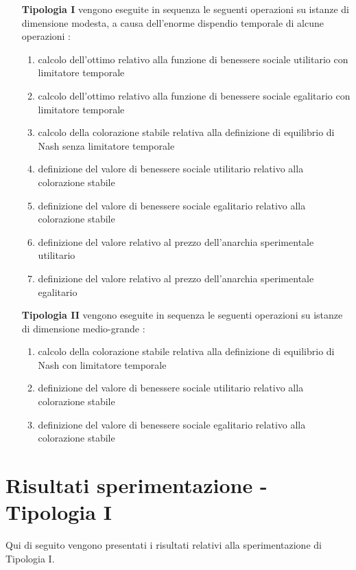 \begin{itemize}
	\item [\textbf{Tipologia I}] vengono eseguite in sequenza le seguenti operazioni su istanze di dimensione modesta, a causa dell'enorme dispendio temporale di alcune operazioni :
	\begin{enumerate}
		\item calcolo dell'ottimo relativo alla funzione di benessere sociale utilitario con limitatore temporale
		\item calcolo dell'ottimo relativo alla funzione di benessere sociale egalitario con limitatore temporale
		\item calcolo della colorazione stabile relativa alla definizione di equilibrio di Nash senza limitatore temporale
		\item definizione del valore di benessere sociale utilitario relativo alla colorazione stabile
		\item definizione del valore di benessere sociale egalitario relativo alla colorazione stabile
		\item definizione del valore relativo al prezzo dell'anarchia sperimentale utilitario
		\item definizione del valore relativo al prezzo dell'anarchia sperimentale egalitario
	\end{enumerate}
	\item [\textbf{Tipologia II}] vengono eseguite in sequenza le seguenti operazioni su istanze di dimensione medio-grande :
	\begin{enumerate}
		\item calcolo della colorazione stabile relativa alla definizione di equilibrio di Nash con limitatore temporale
		\item definizione del valore di benessere sociale utilitario relativo alla colorazione stabile
		\item definizione del valore di benessere sociale egalitario relativo alla colorazione stabile
	\end{enumerate}
\end{itemize}

\section{Risultati sperimentazione - Tipologia I}
\justify
Qui di seguito vengono presentati i risultati relativi alla sperimentazione di Tipologia I.\\

